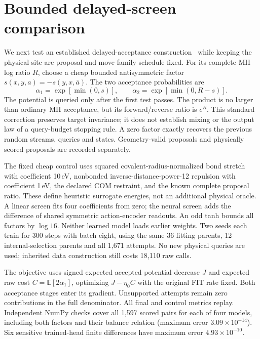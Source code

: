 \section{Bounded delayed-screen comparison}
\label{app:delayed-screen}

We next test an established delayed-acceptance construction~\citep{banterle2019delayed}
while keeping the physical site-arc proposal and move-family schedule fixed.
For its complete MH log ratio $R$, choose a cheap bounded antisymmetric factor
$s(x,y,a)=-s(y,x,\bar a)$. The two acceptance probabilities are
\begin{equation}
 \alpha_1=\exp[\min(0,s)],\qquad
 \alpha_2=\exp[\min(0,R-s)].
\end{equation}
The potential is queried only after the first test passes. The product is no
larger than ordinary MH acceptance, but its forward/reverse ratio is $e^R$.
This standard correction preserves target invariance; it does not establish
mixing or the output law of a query-budget stopping rule. A zero factor exactly
recovers the previous random streams, queries and states. Geometry-valid
proposals and physically scored proposals are recorded separately.

The fixed cheap control uses squared covalent-radius-normalized bond stretch
with coefficient 10\,eV, nonbonded inverse-distance-power-12 repulsion with
coefficient 1\,eV, the declared COM restraint, and the known complete proposal
ratio. These define heuristic surrogate energies, not an additional physical
oracle. A linear screen fits four coefficients from zero; the neural screen
adds the difference of shared symmetric action-encoder readouts. An odd tanh
bounds all factors by $\log16$. Neither learned model loads earlier weights.
Two seeds each train for 300 steps with batch eight, using the same 36 fitting
parents, 12 internal-selection parents and all 1,671 attempts. No new physical
queries are used; inherited data construction still costs 18,110 raw calls.

The objective uses signed expected accepted potential decrease $J$ and expected
raw cost $C=\mathbb E[2\alpha_1]$, optimizing $J-\eta_0C$ with the original FIT
rate fixed. Both acceptance stages enter its gradient. Unsupported attempts
remain zero contributions in the full denominator. All final and control metrics
replay. Independent NumPy checks cover all 1,597 scored pairs for each of four
models, including both factors and their balance relation (maximum error
$3.09\times10^{-14}$). Six sensitive trained-head finite differences have maximum
error $4.93\times10^{-10}$.

